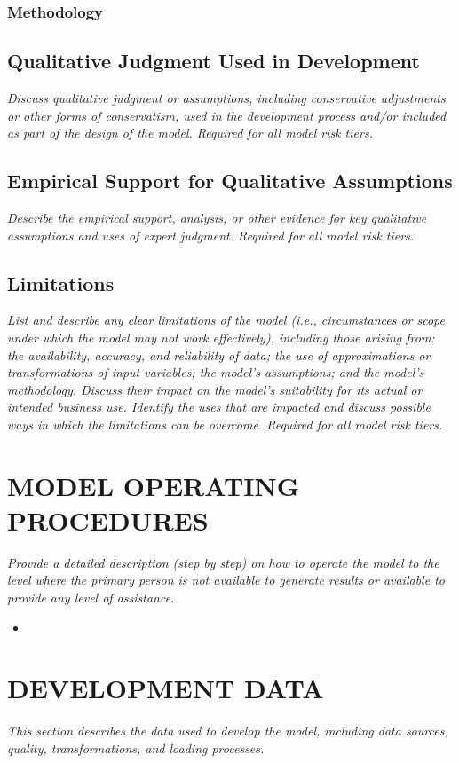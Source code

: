 \documentclass[12pt,letterpaper]{article}
\begin{document}
\subsubsection{Methodology}

\subsection{Qualitative Judgment Used in Development}
\textit{Discuss qualitative judgment or assumptions, including conservative adjustments or other forms of conservatism, used in the development process and/or included as part of the design of the model. Required for all model risk tiers.}

\subsection{Empirical Support for Qualitative Assumptions}
\textit{Describe the empirical support, analysis, or other evidence for key qualitative assumptions and uses of expert judgment. Required for all model risk tiers.}

\subsection{Limitations}
\textit{List and describe any clear limitations of the model (i.e., circumstances or scope under which the model may not work effectively), including those arising from: the availability, accuracy, and reliability of data; the use of approximations or transformations of input variables; the model's assumptions; and the model's methodology. Discuss their impact on the model's suitability for its actual or intended business use. Identify the uses that are impacted and discuss possible ways in which the limitations can be overcome. Required for all model risk tiers.}

\section{MODEL OPERATING PROCEDURES}
\textit{Provide a detailed description (step by step) on how to operate the model to the level where the primary person is not available to generate results or available to provide any level of assistance.}
\begin{itemize}
\item 
\end{itemize}

\section{DEVELOPMENT DATA}
\textit{This section describes the data used to develop the model, including data sources, quality, transformations, and loading processes.}
\end{document}

